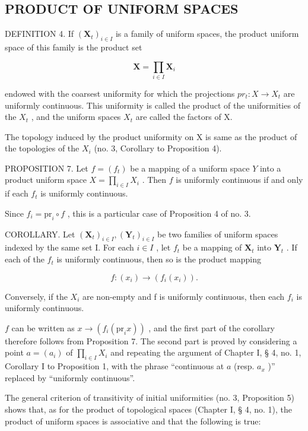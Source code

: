 \subsection{PRODUCT OF UNIFORM SPACES}

DEFINITION 4. If \((\mathbf{X}_t)_{i\in I}\) is a family of uniform spaces, the product uniform space of this family is the product set

\[
\mathbf {X} = \prod_ {i \in I} \mathbf {X} _ {i}
\]

endowed with the coarsest uniformity for which the projections \(pr_{t}: X \rightarrow X_{t}\) are uniformly continuous. This uniformity is called the product of the uniformities of the \(X_{t}\) , and the uniform spaces \(X_{t}\) are called the factors of X.

The topology induced by the product uniformity on X is same as the product of the topologies of the \(X_{i}\) (no. 3, Corollary to Proposition 4).

PROPOSITION 7. Let \(f = (f_{t})\) be a mapping of a uniform space \(Y\) into a product uniform space \(X = \prod_{i \in I} X_{i}\) . Then \(f\) is uniformly continuous if and only if each \(f_{t}\) is uniformly continuous.

Since \(f_{i} = \mathrm{pr}_{i} \circ f\) , this is a particular case of Proposition 4 of no. 3.

COROLLARY. Let \((\mathbf{X}_t)_{i \in I}, (\mathbf{Y}_t)_{i \in I}\) be two families of uniform spaces indexed by the same set I. For each \(i \in I\) , let \(f_t\) be a mapping of \(\mathbf{X}_t\) into \(\mathbf{Y}_t\) . If each of the \(f_t\) is uniformly continuous, then so is the product mapping

\[
f: (x _ {i}) \rightarrow (f _ {i} (x _ {i})).
\]

Conversely, if the \(X_{i}\) are non-empty and f is uniformly continuous, then each \(f_{i}\) is uniformly continuous.

\(f\) can be written as \(x \to (f_{i}(\mathrm{pr}_{i}x))\) , and the first part of the corollary therefore follows from Proposition 7. The second part is proved by considering a point \(a = (a_{i})\) of \(\prod_{i \in I} X_{i}\) and repeating the argument of Chapter I, § 4, no. 1, Corollary I to Proposition 1, with the phrase ``continuous at \(a\) (resp. \(a_{x}\) )'' replaced by ``uniformly continuous''.

The general criterion of transitivity of initial uniformities (no. 3, Proposition 5) shows that, as for the product of topological spaces (Chapter I, § 4, no. 1), the product of uniform spaces is associative and that the following is true:

